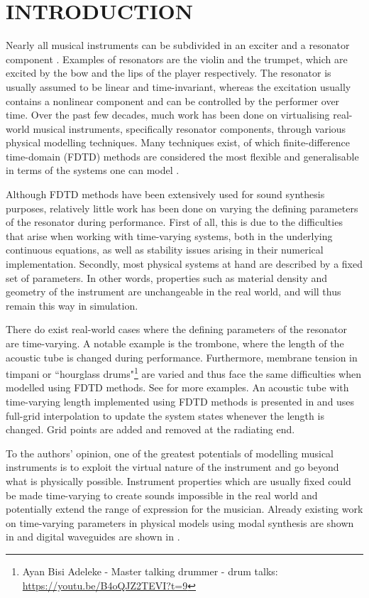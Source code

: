 \documentclass[fleqn]{jaes}
\begin{document}
\section{INTRODUCTION}\label{sec:introduction}

Nearly all musical instruments can be subdivided in an exciter and a resonator component \cite{Borin1989}. Examples of resonators are the violin and the trumpet, which are excited by the bow and the lips of the player respectively. The resonator is usually assumed to be linear and time-invariant, whereas the excitation usually contains a nonlinear component and can be controlled by the performer over time. Over the past few decades, much work has been done on virtualising real-world musical instruments, specifically resonator components, through various physical modelling techniques. Many techniques exist, of which finite-difference time-domain (FDTD) methods are considered the most flexible and generalisable in terms of the systems one can model \cite{Bilbao2009}.

Although FDTD methods have been extensively used for sound synthesis purposes, relatively little work has been done on varying the defining parameters of the resonator during performance. First of all, this is due to the difficulties that arise when working with time-varying systems, both in the underlying continuous equations, as well as stability issues arising in their numerical implementation. Secondly, most physical systems at hand are described by a fixed set of parameters. In other words, properties such as material density and geometry of the instrument are unchangeable in the real world, and will thus remain this way in simulation.

There do exist real-world cases where the defining parameters of the resonator are time-varying.
A notable example is the trombone, where the length of the acoustic tube is changed during performance. Furthermore, membrane tension in timpani or ``hourglass drums"\footnote{Ayan Bisi Adeleke - Master talking drummer - drum talks: \url{https://youtu.be/B4oQJZ2TEVI?t=9}} are varied and thus face the same difficulties when modelled using FDTD methods. See \cite[Sec. 12.4]{Willemsen2021Thesis} for more examples. An acoustic tube with time-varying length implemented using FDTD methods is presented in \cite{Hofmann2019} and uses full-grid interpolation to update the system states whenever the length is changed. Grid points are added and removed at the radiating end.

To the authors' opinion, one of the greatest potentials of modelling musical instruments is to exploit the virtual nature of the instrument and go beyond what is physically possible. Instrument properties which are usually fixed could be made time-varying to create sounds impossible in the real world and potentially extend the range of expression for the musician. Already existing work on time-varying parameters in physical models using modal synthesis \cite{morrison1993mosaic} are shown in \cite{Mehes2016, Willemsen2017} and digital waveguides \cite{Smith1992} are shown in \cite{Michon2014}.
\end{document}
